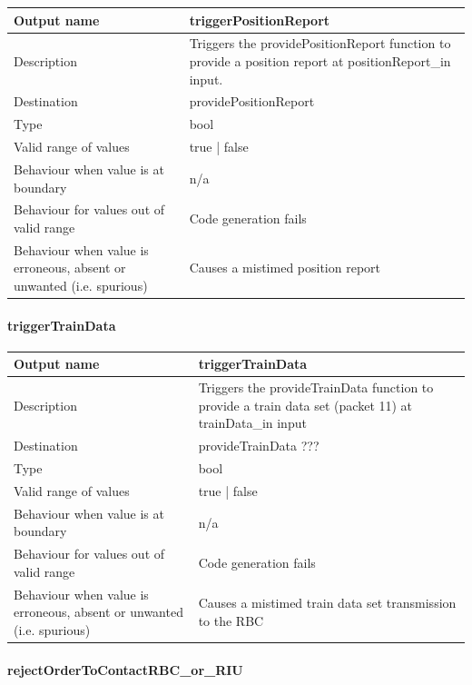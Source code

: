 \begin{longtable}{p{}p{}}
	\toprule
	Output name				& triggerPositionReport \\
	\midrule
	Description				& Triggers the providePositionReport function to provide a position report at positionReport\_in input. \\
	\midrule
	Destination				& providePositionReport \\ 
	\midrule
	Type					& bool \\
	\midrule
	Valid range of values	& true | false \\
	\midrule
	Behaviour when value is at boundary	& n/a \\
	\midrule
	Behaviour for values out of valid range	& Code generation fails \\
	\midrule
	Behaviour when value is erroneous, absent or unwanted (i.e. spurious) & Causes a mistimed position report  \\
	\bottomrule
\end{longtable}


\paragraph{triggerTrainData}

\begin{longtable}{p{}p{}}
	\toprule
	Output name				& triggerTrainData \\
	\midrule
	Description				& Triggers the provideTrainData function to provide a train data set (packet 11) at trainData\_in input \\
	\midrule
	Destination				& provideTrainData ??? \\ 
	\midrule
	Type					& bool \\
	\midrule
	Valid range of values	& true | false \\
	\midrule
	Behaviour when value is at boundary	& n/a \\
	\midrule
	Behaviour for values out of valid range	& Code generation fails \\
	\midrule
	Behaviour when value is erroneous, absent or unwanted (i.e. spurious) & Causes a mistimed train data set transmission to the RBC \\
	\bottomrule
\end{longtable}

\paragraph{rejectOrderToContactRBC\_or\_RIU}

